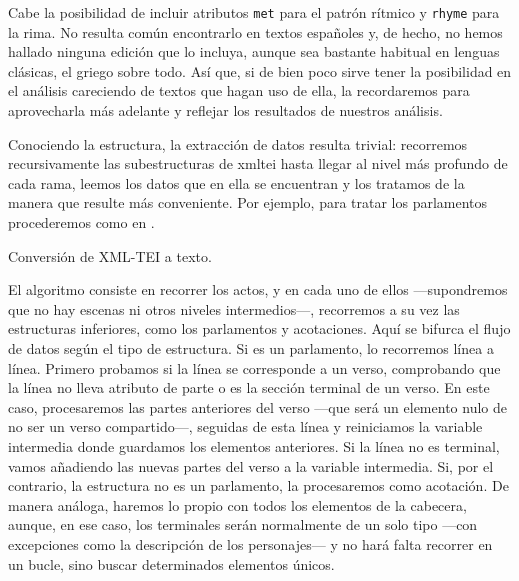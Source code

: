 Cabe la posibilidad de incluir atributos \texttt{met} para el patrón rítmico y \texttt{rhyme} para la rima. No resulta común encontrarlo en textos españoles y, de hecho, no hemos hallado ninguna edición que lo incluya, aunque sea bastante habitual en lenguas clásicas, el griego sobre todo. Así que, si de bien poco sirve tener la posibilidad en el análisis careciendo de textos que hagan uso de ella, la recordaremos para aprovecharla más adelante y reflejar los resultados de nuestros análisis.

Conociendo la estructura, la extracción de datos resulta trivial: recorremos recursivamente las subestructuras de \ac{xmltei}  hasta llegar al nivel más profundo de cada rama, leemos los datos que en ella se encuentran y los tratamos de la manera que resulte más conveniente. Por ejemplo, para tratar los parlamentos procederemos como en .

\begin{algorithm}[!ht] %
	\caption{Conversión de XML-TEI a texto.}\label{list:xml2txt}
\end{algorithm}

El algoritmo consiste en recorrer los actos, y en cada uno de ellos —supondremos que no hay escenas ni otros niveles intermedios—, recorremos a su vez las estructuras inferiores, como los parlamentos y acotaciones. Aquí se bifurca el flujo de datos según el tipo de estructura. Si es un parlamento, lo recorremos línea a línea. Primero probamos si la línea se corresponde a un verso, comprobando que la línea no lleva atributo de parte o es la sección terminal de un verso. En este caso, procesaremos las partes anteriores del verso —que será un elemento nulo de no ser un verso compartido—, seguidas de esta línea y reiniciamos la variable intermedia donde guardamos los elementos anteriores. Si la línea no es terminal, vamos añadiendo las nuevas partes del verso a la variable intermedia. Si, por el contrario, la estructura no es un parlamento, la procesaremos como acotación. De manera análoga, haremos lo propio con todos los elementos de la cabecera, aunque, en ese caso, los terminales serán normalmente de un solo tipo —con excepciones como la descripción de los personajes— y no hará falta recorrer en un bucle, sino buscar determinados elementos únicos.

